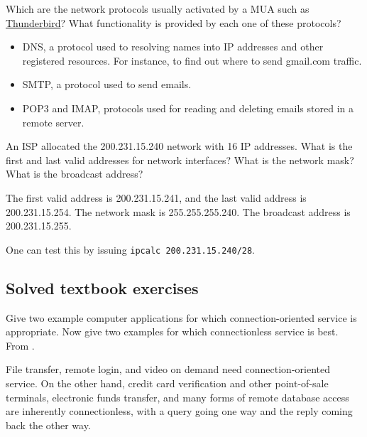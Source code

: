 \begin{Exercise}
Which are the network protocols usually activated by a MUA such as \href{https://en.wikipedia.org/wiki/Mozilla_Thunderbird}{Thunderbird}?
What functionality is provided by each one of these protocols?
\end{Exercise}
\begin{Answer}
\begin{itemize}
    \item DNS, a protocol used to resolving names into IP addresses and other registered resources. For instance, to find out where to send gmail.com traffic.
    \item SMTP, a protocol used to send emails.
    \item POP3 and IMAP, protocols used for reading and deleting emails stored in a remote server.
\end{itemize}
\end{Answer}

\begin{Exercise}
An ISP allocated the 200.231.15.240 network with 16 IP addresses. What is the first and last valid addresses for network interfaces? What is the network mask? What is the broadcast address?
\end{Exercise}
\begin{Answer}
The first valid address is 200.231.15.241, and the last valid address is 200.231.15.254.
The network mask is 255.255.255.240. The broadcast address is 200.231.15.255.

One can test this by issuing \texttt{ipcalc 200.231.15.240/28}.
\end{Answer}

\begin{Exercise}
\end{Exercise}

\begin{Exercise}
\end{Exercise}

\subsection{Solved textbook exercises}
\setcounter{Exercise}{0}

\begin{Exercise}
Give two example computer applications for which connection-oriented service is appropriate.
Now give two examples for which connectionless service is best.
From \cite{computer-networks-tanenbaum-2012}.
\end{Exercise}
\begin{Answer}
File transfer, remote login, and video on demand need connection-oriented service.
On the other hand, credit card verification and other point-of-sale terminals, electronic funds transfer, and many forms of remote database access are inherently connectionless, with a query going one way and the reply coming back the other way.
\end{Answer}

